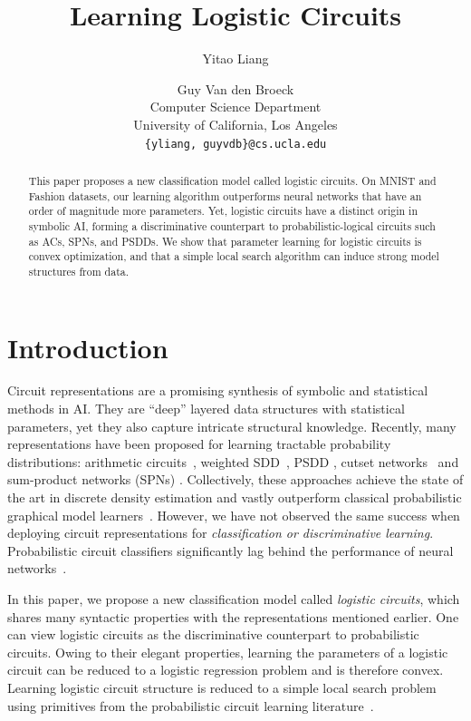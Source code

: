 \documentclass[letterpaper]{article} %
\begin{document}
\title{Learning Logistic Circuits}
\author{Yitao Liang \and Guy Van den Broeck\\
Computer Science Department\\
University of California, Los Angeles\\
\texttt{\{yliang, guyvdb\}@cs.ucla.edu}\\
}


\maketitle

\begin{abstract}
This paper proposes a new classification model called logistic circuits. On MNIST and Fashion datasets, our learning algorithm outperforms neural networks that have an order of magnitude more parameters. Yet, logistic circuits have a distinct origin in symbolic AI, forming a discriminative counterpart to probabilistic-logical circuits such as ACs, SPNs, and PSDDs.
We show that parameter learning for logistic circuits is convex optimization, and that a simple local search algorithm can induce strong model structures from data.
\end{abstract}

\section{Introduction}
Circuit representations are a promising synthesis of symbolic and statistical methods in AI. They are ``deep'' layered data structures with statistical parameters, yet they also capture intricate structural knowledge.
Recently, many representations have been proposed for learning tractable probability distributions: arithmetic circuits~\cite{lowd:uai08}, weighted SDD~\cite{BekkerNIPS15}, PSDD \cite{KisaVCD14}, cutset networks~\cite{rahman2014cutset} and sum-product networks (SPNs) \cite{poon2011sum}.
Collectively, these approaches achieve the state of the art in discrete density estimation and vastly outperform classical probabilistic graphical model learners~\cite{gens2013learning,rooshenas2014learning,adel2015learning,rahman2016merging,Liang2017}. However, we have not observed the same success when deploying circuit representations for \emph{classification or discriminative learning}. Probabilistic circuit classifiers significantly lag behind the performance of neural networks~\cite{classificationStanding}.

In this paper, we propose a new classification model called \emph{logistic circuits}, which shares many syntactic properties with the representations mentioned earlier. One can view logistic circuits as the discriminative counterpart to probabilistic circuits. Owing to their elegant properties, learning the parameters of a logistic circuit can be reduced to a logistic regression problem and is therefore convex.
Learning logistic circuit structure is reduced to a simple local search problem using primitives from the probabilistic circuit learning literature~\cite{Liang2017}.
\end{document}
